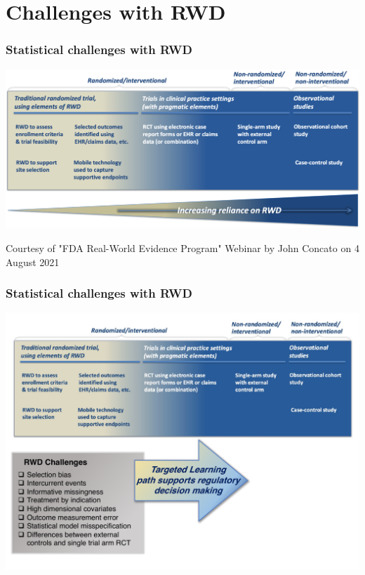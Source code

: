 \documentclass[t]{beamer}
\begin{document}



\section{Challenges with RWD}

\begin{frame}
\frametitle{Statistical challenges with RWD}
\vspace{20pt}
\begin{center}
\includegraphics[width=\textwidth]{figures/john_slide8_figure.png}
\end{center}
\vspace{35pt}
\tiny{Courtesy of "FDA Real-World Evidence Program" Webinar by John Concato on 4 August 2021}
\end{frame}

\begin{frame}
\frametitle{Statistical challenges with RWD}
\vspace{-18pt}
\begin{center}
\includegraphics[width=1.02\textwidth]{figures/TLpath1_edit.pdf}
\end{center}
\end{frame}
\end{document}
